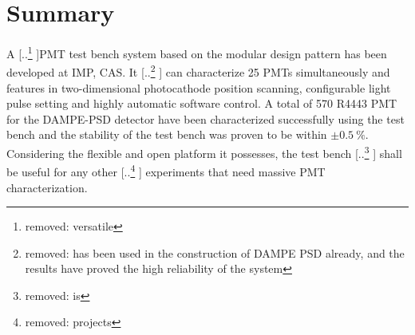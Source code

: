 \documentclass{nst}
\providecommand{\DIFadd}[1]{{\protect\color{blue} \sf #1}} %
\providecommand{\DIFdel}[1]{{\protect\color{red} [..\footnote{removed: #1} ]}} %
\providecommand{\DIFaddbegin}{} %
\providecommand{\DIFaddend}{} %
\providecommand{\DIFdelbegin}{} %
\providecommand{\DIFdelend}{} %
\begin{document}
\section{Summary}
\label{sec:summary}
A \DIFdelbegin \DIFdel{versatile }\DIFdelend PMT test bench system \DIFaddbegin \DIFadd{based on the modular design pattern }\DIFaddend has been developed at IMP, CAS.
It \DIFdelbegin \DIFdel{has been used in the construction of DAMPE PSD already, and the results have proved the high reliability of the system}\DIFdelend \DIFaddbegin \DIFadd{can characterize 25 PMTs simultaneously and features in two-dimensional photocathode position scanning, configurable light pulse setting and highly automatic software control. A total of 570 R4443 PMT for the DAMPE-PSD detector have been characterized successfully using the test bench and the stability of the test bench was proven to be within $\pm\SI{0.5}{\percent}$}\DIFaddend .
Considering the flexible and open platform it possesses, the test bench \DIFdelbegin \DIFdel{is }\DIFdelend \DIFaddbegin \DIFadd{shall be }\DIFaddend useful for any other \DIFdelbegin \DIFdel{projects }\DIFdelend \DIFaddbegin \DIFadd{experiments }\DIFaddend that need massive PMT characterization. 

\end{document}
